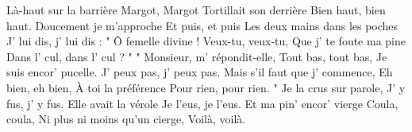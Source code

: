 \footnotemark [ititle={Margot}]

\beginverse
Là-haut sur la barrière
Margot, Margot
Tortillait son derrière
Bien haut, bien haut.
\endverse
\beginverse
Doucement je m'approche
Et puis, et puis
Les deux mains dans les poches
J' lui dis, j' lui dis :
\endverse
\beginverse
" Ô femelle divine !
Veux-tu, veux-tu,
Que j' te foute ma pine
Dans l' cul, dans l' cul ? "
\endverse
\beginverse
" Monsieur, m' répondit-elle,
Tout bas, tout bas,
Je suis encor' pucelle.
J' peux pas, j' peux pas.
\endverse
\beginverse
Mais s'il faut que j' commence,
Eh bien, eh bien,
À toi la préférence
Pour rien, pour rien. "
\endverse
\beginverse
Je la crus sur parole,
J' y fus, j' y fus.
Elle avait la vérole
Je l'eus, je l'eus.
\endverse
\beginverse
Et ma pin' encor' vierge
Coula, coula,
Ni plus ni moins qu'un cierge,
Voilà, voilà.
\endverse
\endsong
